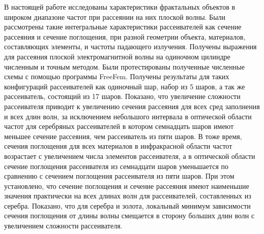 \conclusion
В настоящей работе исследованы характеристики фрактальных объектов в широком диапазоне частот при рассеянии на них плоской волны. Были рассмотрены такие интегральные характеристики рассеивателей как сечение рассеяния и сечение поглощения, при разной геометрии объекта, материалов, составляющих элементы, и частоты падающего излучения. Получены выражения для рассеяния плоской электромагнитной волны на одиночном цилиндре численным и точным методом. Были протестированы полученные численные схемы с помощью программы FreeFem. Получены результаты для таких конфигураций рассеивателей как одиночный шар, набор из 5 шаров, а так же рассеиватель, состоящий из 17 шаров. Показано, что увеличение сложности рассеивателя приводит к увеличению сечения рассеяния для всех сред заполнения и всех длин волн, за исключением небольшого интервала в оптической области частот для серебряных рассеивателей в котором семнадцать шаров имеют меньшее сечение рассеяния, чем рассеиватель из пяти шаров.
В тоже время, сечения поглощения для всех материалов в инфракрасной области частот возрастает с увеличением числа элементов рассеивателя, а в оптической области сечение поглощения рассеивателя из семнадцати шаров уменьшается по сравнению с сечением поглощения рассеивателя из пяти шаров.
При этом установлено, что сечение поглощения и сечение рассеяния имеют наименьшие значения практически на всех длинах волн для рассеивателей, составленных из серебра. 
Показано, что для серебра и золота, локальный минимум зависимости сечения поглощения от длины волны смещается в сторону больших длин волн с увеличением сложности рассеивателя.


